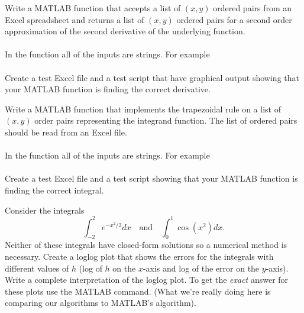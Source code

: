 \begin{problem}
    Write a MATLAB function that accepts a list of $(x,y)$ ordered pairs from an Excel
    spreadsheet and returns a list of $(x,y)$ ordered pairs for a second order
    approximation of the second derivative of the
    underlying function. \\
     \\
    In the function all of the inputs are strings.  For example \\
    \\
    Create a test Excel file and a test script that have graphical output showing that
    your MATLAB function is finding the correct derivative.
\end{problem}


\begin{problem}\label{prob:trap_from_data}
    Write a MATLAB function that implements the trapezoidal rule on a list of $(x,y)$
    order pairs representing the integrand function.  The list of ordered pairs should be
    read from an Excel file. \\
    \\
    In the function all of the inputs are strings.  For example \\
    \\
    Create a test Excel file and a test script showing that your MATLAB function is
    finding the correct integral.
\end{problem}

\begin{problem}
    Consider the integrals 
    \[ \int_{-2}^2 e^{-x^2/2} dx \quad \text{and} \quad \int_0^1 \cos(x^2) dx. \]
    Neither of these integrals have closed-form solutions so a numerical method is
    necessary.  Create a loglog plot that shows the errors for the integrals with different values of $h$ (log
    of $h$ on the $x$-axis and log of the error on the $y$-axis).
    Write a complete interpretation of the loglog plot.  
    To get the {\it exact} answer for these plots use the MATLAB  command.
    (What we're really doing here is comparing our algorithms to MATLAB's algorithm).
\end{problem}



